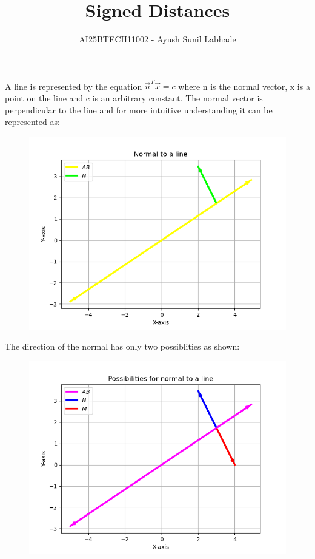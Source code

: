 \documentclass[journal,12pt,onecolumn]{IEEEtran}
\begin{document}
\title{Signed Distances}
\author{AI25BTECH11002 - Ayush Sunil Labhade}
{\let\newpage\relax\maketitle}
A line is represented by the equation $\vec{n}^T\vec{x}=c$ where n is the normal vector, x is a point on the line and c is an arbitrary constant. 
The normal vector is perpendicular to the line and for more intuitive understanding it can be represented as:
\begin{figure}[H]
	\centering
	\includegraphics[scale=0.5]{norm}
	\caption{}
	\label{fig1}
\end{figure}
The direction of the normal has only two possiblities as shown:
\begin{figure}[H]
	\centering
	\includegraphics[scale=0.5]{binorm}
	\caption{}
	\label{fig2}
\end{figure}
\end{document}

